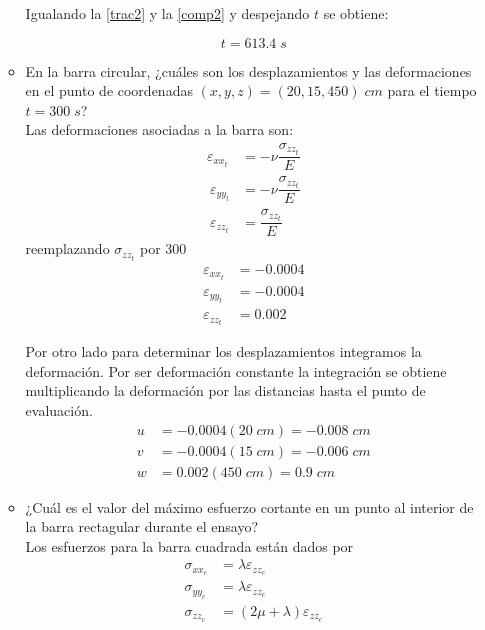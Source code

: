 \documentclass[../notas medios.tex]{subfiles}
\begin{document}
\begin{enumerate}
\begin{itemize}
	Igualando la \cref {trac2} y la  \cref{comp2} y despejando $t$ se obtiene: 
	
	\[t=613.4 \; s\]
	
	
	\item En la barra circular, ¿cuáles son los desplazamientos y las deformaciones en el punto de coordenadas $(x,y,z) = (20,15,450) \; cm$ para el tiempo $t = 300 \;s$?  \\

Las deformaciones asociadas a la barra son:  
%
	\begin{equation}
	\begin{split}	
	{\varepsilon _{xx_t}} &= -\nu \dfrac{\sigma_{zz_t} }{E} \\\
	{\varepsilon _{yy_t}} &= -\nu \dfrac{\sigma_{zz_t} }{E} \\\
	{\varepsilon _{zz_t}} &= \dfrac{\sigma_{zz_t} }{E} 
	\end{split}
	\label{defpto2}
	\end{equation}
%	
reemplazando $\sigma_{zz_t}$ por 300
%
	\begin{equation}
	\begin{split}
	{\varepsilon _{xx_t}} &= -0.0004 \\
	{\varepsilon _{yy_t}} &= -0.0004 \\
	{\varepsilon _{zz_t}} &= 0.002
	\end{split}
	\label{defpto2sol}
	\end{equation}

Por otro lado para determinar los desplazamientos integramos la deformación. Por ser deformación constante la integración se obtiene multiplicando la deformación por las distancias hasta el punto de evaluación. 
%
	\begin{equation}
	\begin{split}
	{u} &= -0.0004 (20  \;cm) = -0.008 \;cm \\
	{v} &= -0.0004 (15  \;cm) = -0.006 \;cm  \\
	{w} &= 0.002  (450  \;cm) = 0.9  \; cm 
	\end{split}
	\label{defpto2sol}
	\end{equation}

	\item   ¿Cuál es el valor del máximo esfuerzo cortante en un punto al interior de la barra rectagular durante el ensayo? \\

Los esfuerzos para la barra cuadrada están dados por 
%
	\begin{equation}
	\begin{split}	
	{\sigma_{xx_c}} &=   \lambda \varepsilon _{zz_c} \\
	{\sigma_{yy_c}} &=   \lambda \varepsilon _{zz_c} \\
	{\sigma_{zz_c}} &=  (2\mu + \lambda) \varepsilon _{zz_c}
	\end{split}
	\label{defpto2}
	\end{equation}


\end{itemize}
\end{enumerate}
\end{document}
